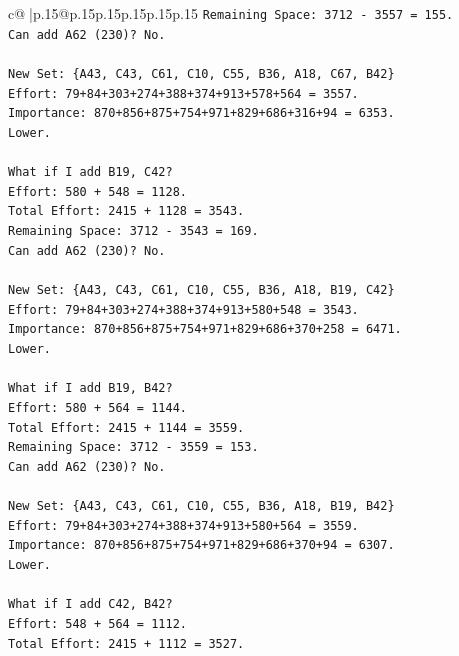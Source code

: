 \documentclass{article}
\begin{document}
{\begin{supertabular}{c@{$\;$}|p{.15\linewidth}@{}p{.15\linewidth}p{.15\linewidth}p{.15\linewidth}p{.15\linewidth}p{.15\linewidth}}
{{{\texttt{Remaining Space: 3712 {-} 3557 = 155.} \\
\texttt{Can add A62 (230)? No.} \\
\\ 
\texttt{New Set: \{A43, C43, C61, C10, C55, B36, A18, C67, B42\}} \\
\texttt{Effort: 79+84+303+274+388+374+913+578+564 = 3557.} \\
\texttt{Importance: 870+856+875+754+971+829+686+316+94 = 6353.} \\
\texttt{Lower.} \\
\\ 
\texttt{What if I add B19, C42?} \\
\texttt{Effort: 580 + 548 = 1128.} \\
\texttt{Total Effort: 2415 + 1128 = 3543.} \\
\texttt{Remaining Space: 3712 {-} 3543 = 169.} \\
\texttt{Can add A62 (230)? No.} \\
\\ 
\texttt{New Set: \{A43, C43, C61, C10, C55, B36, A18, B19, C42\}} \\
\texttt{Effort: 79+84+303+274+388+374+913+580+548 = 3543.} \\
\texttt{Importance: 870+856+875+754+971+829+686+370+258 = 6471.} \\
\texttt{Lower.} \\
\\ 
\texttt{What if I add B19, B42?} \\
\texttt{Effort: 580 + 564 = 1144.} \\
\texttt{Total Effort: 2415 + 1144 = 3559.} \\
\texttt{Remaining Space: 3712 {-} 3559 = 153.} \\
\texttt{Can add A62 (230)? No.} \\
\\ 
\texttt{New Set: \{A43, C43, C61, C10, C55, B36, A18, B19, B42\}} \\
\texttt{Effort: 79+84+303+274+388+374+913+580+564 = 3559.} \\
\texttt{Importance: 870+856+875+754+971+829+686+370+94 = 6307.} \\
\texttt{Lower.} \\
\\ 
\texttt{What if I add C42, B42?} \\
\texttt{Effort: 548 + 564 = 1112.} \\
\texttt{Total Effort: 2415 + 1112 = 3527.} \\
}}}
\end{supertabular}}
\end{document}
